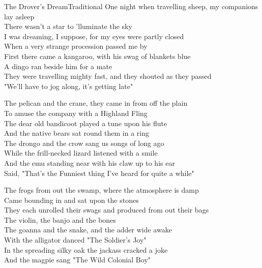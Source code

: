 \documentclass[a4paper,12pt]{article}
\begin{document}
\begin{song}{The Drover's Dream}{Traditional}
	One night when travelling sheep, my companions lay asleep\\
There wasn't a star to 'lluminate the sky\\
I was dreaming, I suppose, for my eyes were partly closed\\
When a very strange procession passed me by\\
First there came a kangaroo, with his swag of blankets blue\\ 
A dingo ran beside him for a mate\\
They were travelling mighty fast, and they shouted as they passed\\ 
"We'll have to jog along, it's getting late"
\bigskip\par
	The pelican and the crane, they came in from off the plain\\
	To amuse the company with a Highland Fling\\
	The dear old bandicoot played a tune upon his flute\\
	And the native bears sat round them in a ring\\
	The drongo and the crow sang us songs of long ago\\ 
	While the frill-necked lizard listened with a smile\\ 
	And the emu standing near with his claw up to his ear\\ 
	Said, "That's the Funniest thing I've heard for quite a while" 

\bigskip\par

	The frogs from out the swamp, where the atmosphere is damp\\
	Came bounding in and sat upon the stones\\ 
	They each unrolled their swags and produced from out their bags\\ 
The violin, the banjo and the bones\\
	The goanna and the snake, and the adder wide awake\\
	With the alligator danced "The Soldier's Joy"\\ 
	In the spreading silky oak the jackass cracked a joke\\ 
	And the magpie sang "The Wild Colonial Boy" 


\end{song}
\end{document}
